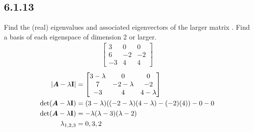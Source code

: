 \documentclass{article}
\begin{document}
\subsection{6.1.13}

Find the (real) eigenvalues and associated eigenvectors of the larger matrix . Find a basis of each eigenspace of dimension 2 or larger.
\begin{align*}
	\begin{bmatrix}
		3 & 0 & 0 \\
		6 & -2 & -2 \\
		-3 & 4 & 4
	\end{bmatrix}
\end{align*}
\begin{align*}
	\left| \matr{A} - \lambda \vect{I} \right| & =
		\begin{bmatrix}
			3 - \lambda & 0 & 0 \\
			7 & -2 - \lambda & -2 \\
			-3 & 4 & 4 - \lambda
		\end{bmatrix} \\
	\det( \matr{A} - \lambda \vect{I} ) & =
		(3 - \lambda)( (-2 - \lambda)(4 - \lambda) - (-2)(4) ) - 0 - 0 \\
	\det( \matr{A} - \lambda \vect{I} ) & = -\lambda(\lambda - 3)(\lambda - 2) \\
	\lambda_{1,2,3} & = 0, 3, 2
\end{align*}
\end{document}
